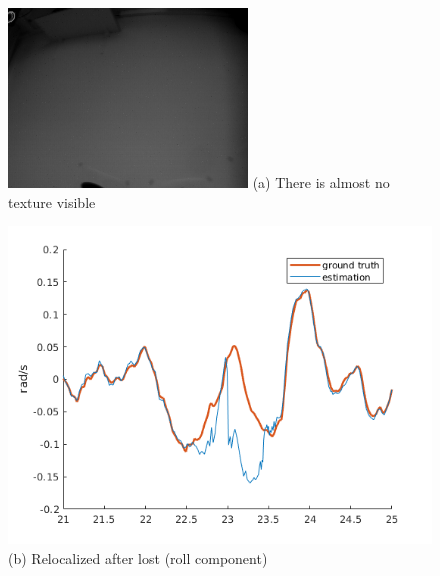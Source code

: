 \begin{enumerate}
    \begin{figure}[h]
      \begin{minipage}[t]{0.48\textwidth}
        \centering \includegraphics[width =
        \textwidth]{images/frame_00000520.png} (a) There is almost no
        texture visible
      \end{minipage}
      \hfill
      \begin{minipage}[t]{0.48\textwidth}
        \centering \includegraphics[width =
        \textwidth]{images/shapes_tr_lost.png} (b) Relocalized after
        lost (roll component)
      \end{minipage}
      \centering
      \begin{minipage}[t]{0.48\textwidth}

\end{minipage}
\end{figure}
\end{enumerate}
